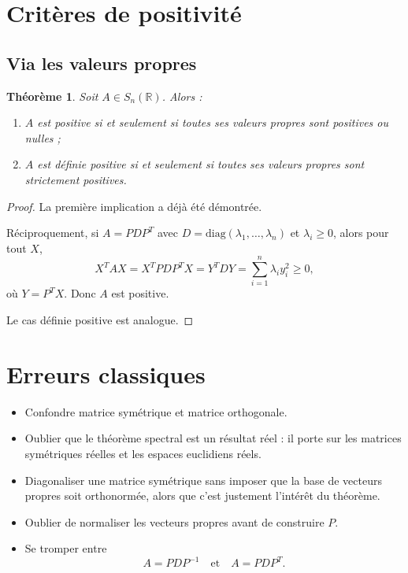 \documentclass[11pt,a4paper]{article}
\newtheorem{theoreme}[definition]{Théorème}
\theoremstyle{remark}
\newcommand{\R}{\mathbb{R}}
\newcommand{\diag}{\mathrm{diag}}
\begin{document}
\section{Critères de positivité}

\subsection{Via les valeurs propres}

\begin{theoreme}
Soit \(A\in S_n(\R)\). Alors :
\begin{enumerate}[label=\arabic*)]
    \item \(A\) est positive si et seulement si toutes ses valeurs propres sont positives ou nulles ;
    \item \(A\) est définie positive si et seulement si toutes ses valeurs propres sont strictement positives.
\end{enumerate}
\end{theoreme}

\begin{proof}
La première implication a déjà été démontrée.

Réciproquement, si \(A=PDP^T\) avec \(D=\diag(\lambda_1,\dots,\lambda_n)\) et \(\lambda_i\ge 0\), alors pour tout \(X\),
\[
X^TAX=X^TPDP^TX=Y^TDY=\sum_{i=1}^n \lambda_i y_i^2\ge 0,
\]
où \(Y=P^TX\). Donc \(A\) est positive.

Le cas définie positive est analogue.
\end{proof}

\section{Erreurs classiques}

\begin{itemize}
    \item Confondre matrice symétrique et matrice orthogonale.
    \item Oublier que le théorème spectral est un résultat réel : il porte sur les matrices symétriques réelles et les espaces euclidiens réels.
    \item Diagonaliser une matrice symétrique sans imposer que la base de vecteurs propres soit orthonormée, alors que c’est justement l’intérêt du théorème.
    \item Oublier de normaliser les vecteurs propres avant de construire \(P\).
    \item Se tromper entre
    \[
    A=PDP^{-1}
    \quad \text{et} \quad
    A=PDP^T.
    \]
\end{itemize}
\end{document}

